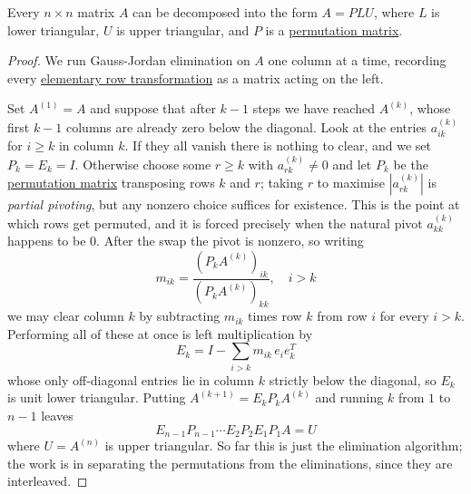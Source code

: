   \begin{theorem}
    \label{thm:plu-decomposition}
    Every $n \times n$ matrix $A$ can be decomposed into the form $A = P L U$, where $L$ is lower triangular, $U$ is upper triangular, and $P$ is a \hyperref[def:permutation-matrix]{permutation matrix}. 
  \end{theorem}
  \begin{proof}
    We run Gauss-Jordan elimination on $A$ one column at a time, recording every \hyperref[def:elementary-row-transformation]{elementary row transformation} as a matrix acting on the left.

    Set $A^{(1)} = A$ and suppose that after $k-1$ steps we have reached $A^{(k)}$, whose first $k-1$ columns are already zero below the diagonal. Look at the entries $a^{(k)}_{ik}$ for $i \geq k$ in column $k$. If they all vanish there is nothing to clear, and we set $P_k = E_k = I$. Otherwise choose some $r \geq k$ with $a^{(k)}_{rk} \neq 0$ and let $P_k$ be the \hyperref[def:permutation-matrix]{permutation matrix} transposing rows $k$ and $r$; taking $r$ to maximise $|a^{(k)}_{rk}|$ is \textit{partial pivoting}, but any nonzero choice suffices for existence. This is the point at which rows get permuted, and it is forced precisely when the natural pivot $a^{(k)}_{kk}$ happens to be $0$. After the swap the pivot is nonzero, so writing
    \begin{equation}
      m_{ik} = \frac{(P_k A^{(k)})_{ik}}{(P_k A^{(k)})_{kk}}, \quad i > k
    \end{equation}
    we may clear column $k$ by subtracting $m_{ik}$ times row $k$ from row $i$ for every $i > k$. Performing all of these at once is left multiplication by
    \begin{equation}
      E_k = I - \sum_{i > k} m_{ik} \, e_i e_k^T
    \end{equation}
    whose only off-diagonal entries lie in column $k$ strictly below the diagonal, so $E_k$ is unit lower triangular. Putting $A^{(k+1)} = E_k P_k A^{(k)}$ and running $k$ from $1$ to $n-1$ leaves
    \begin{equation}
      E_{n-1} P_{n-1} \cdots E_2 P_2 E_1 P_1 A = U
    \end{equation}
    where $U = A^{(n)}$ is upper triangular. So far this is just the elimination algorithm; the work is in separating the permutations from the eliminations, since they are interleaved.


\end{proof}
